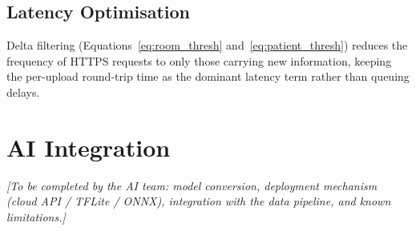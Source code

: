 \subsection{Latency Optimisation}

Delta filtering (Equations~\ref{eq:room_thresh} and~\ref{eq:patient_thresh}) reduces
the frequency of HTTPS requests to only those carrying new information, keeping the
per-upload round-trip time as the dominant latency term rather than queuing delays.

\section{AI Integration}
\begin{center}
	\textit{[To be completed by the AI team: model conversion, deployment mechanism
				(cloud API / TFLite / ONNX), integration with the data pipeline, and known
				limitations.]}
\end{center}
